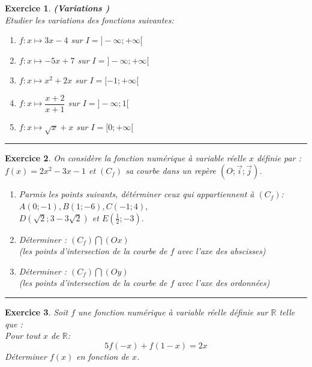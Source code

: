 \documentclass[twocolumn,french]{article}
\newcommand{\R}{\mathbb{R}}
\theoremstyle{plain}
\newtheorem{exo}{Exercice}%
\begin{document}
\begin{exo}
\textbf{\textit{ (Variations )}}\\
Etudier les variations des  fonctions suivantes:
\\
\begin{enumerate}
\item $f:x\longmapsto 3x-4 $ sur $I=]-\infty;+\infty[$
\\
\item $f:x\longmapsto -5x+7$  sur $I=]-\infty;+\infty[$
\\
\item $f:x\longmapsto x^2+2x$  sur $I=[-1;+\infty[$
\\
\item $f:x\longmapsto \dfrac{x+2}{x+1}$  sur $I=]-\infty;1[$
\\
\item $f:x\longmapsto \sqrt{x}+x $  sur $I=[0;+\infty[$
\\
\end{enumerate}
\end{exo}
\hrule

\begin{exo}

On considère la fonction numérique à variable réelle $x$ définie par :\\
 $f(x)=2x^2-3x-1$ et $(C_f)$ sa courbe dans un repère $(O;\vec{i};\vec{j})$.
 \begin{enumerate}
 \item
 Parmis les points suivants, détérminer ceux qui appartiennent à $(C_f)$:  $A(0;-1),B(1;-6),C(-1;4),$ \\
 $D(\sqrt{2};3-3\sqrt{2})$ et $E(\frac{1}{2};-3).$
 \\
\item
Déterminer : $(C_f)\bigcap (Ox)$ \\
(les points d'intersection de la courbe de $f$ avec l'axe des abscisses)
\\
\item
Déterminer : $(C_f)\bigcap (Oy)$ \\
(les points d'intersection de la courbe de $f$ avec l'axe des ordonnées)


 \end{enumerate}
\end{exo}
\hrule
\begin{exo} 
Soit $f$ une fonction numérique à variable réelle  définie sur $\R$ telle que :\\
Pour tout $x$ de $\R$:
$$ 5f(-x)+f(1-x)=2x$$
Déterminer $f(x)$ en fonction de $x$.
\end{exo}
\end{document}
